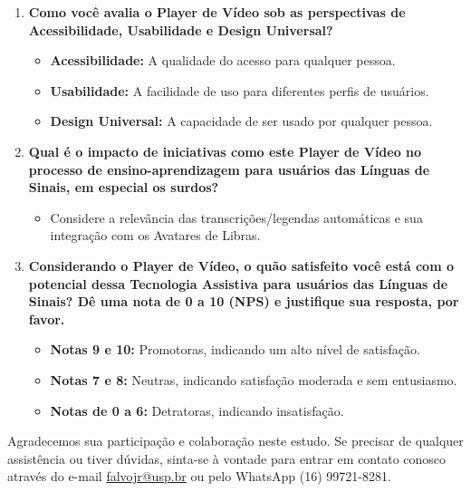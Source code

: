 \begin{enumerate}
\item \textbf{Como você avalia o Player de Vídeo sob as perspectivas de Acessibilidade, Usabilidade e Design Universal?}
\begin{itemize}
    \item \textbf{Acessibilidade:} A qualidade do acesso para qualquer pessoa.
    \item \textbf{Usabilidade:} A facilidade de uso para diferentes perfis de usuários.
    \item \textbf{Design Universal:} A capacidade de ser usado por qualquer pessoa.
\end{itemize}

\item \textbf{Qual é o impacto de iniciativas como este Player de Vídeo no processo de ensino-aprendizagem para usuários das Línguas de Sinais, em especial os surdos?}

\begin{itemize}
    \item Considere a relevância das transcrições/legendas automáticas e sua integração com os Avatares de Libras.
\end{itemize}

\item \textbf{Considerando o Player de Vídeo, o quão satisfeito você está com o potencial dessa Tecnologia Assistiva para usuários das Línguas de Sinais? Dê uma nota de 0 a 10 (NPS) e justifique sua resposta, por favor.}

\begin{itemize}
    \item \textbf{Notas 9 e 10:} Promotoras, indicando um alto nível de satisfação.
    \item \textbf{Notas 7 e 8:} Neutras, indicando satisfação moderada e sem entusiasmo.
    \item \textbf{Notas de 0 a 6:} Detratoras, indicando insatisfação.
\end{itemize}
\end{enumerate}

Agradecemos sua participação e colaboração neste estudo. Se precisar de qualquer assistência ou tiver dúvidas, sinta-se à vontade para entrar em contato conosco através do e-mail \url{falvojr@usp.br} ou pelo WhatsApp (16) 99721-8281.